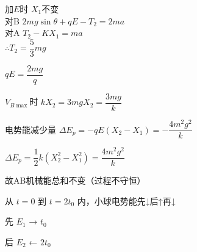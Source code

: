 加$E$时 $X_1$不变\\
\hspace*{1em}对B $2mg\sin\theta+qE-T_2=2ma$\\
\hspace*{1em}对A $T_2-KX_1=ma$\\
\hspace*{2em}$\therefore T_2=\dfrac{5}{3}mg$

$q$\quad $E=\dfrac{2mg}{q}$

$V_{B\max}$时 $kX_2=3mg$\quad $X_2=\dfrac{3mg}{k}$

电势能减少量 $\Delta E_p=-qE(X_2-X_1)=-\dfrac{4m^2g^2}{k}$

$\Delta E_p=\dfrac12 k(X_2^2-X_1^2)=\dfrac{4m^2g^2}{k}$

故AB机械能总和不变（过程不守恒） %

从 $t=0$ 到 $t=2t_0$ 内，小球电势能先↓后↑再↓

先 $E_1$ → $t_0$

后 $E_2$ ← $2t_0$

